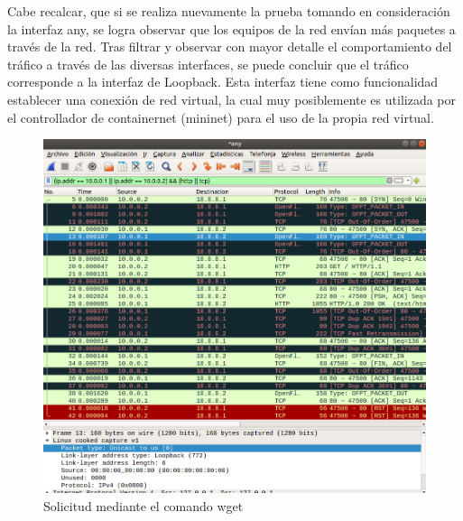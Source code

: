\documentclass[10pt]{article}
\begin{document}
\noindent
Cabe recalcar, que si se realiza nuevamente la prueba tomando en consideración la interfaz any, se logra observar que los equipos de la red envían más paquetes a través de la red. Tras filtrar y observar con mayor detalle el comportamiento del tráfico a través de las diversas interfaces, se puede concluir que el tráfico corresponde a la interfaz de Loopback. Esta interfaz tiene como funcionalidad establecer una conexión de red virtual, la cual muy posiblemente es utilizada por el controllador de containernet (mininet) para el uso de la propia red virtual.
\newline



\begin{multicols}{2}

\begin{figure}[H]
    \centering
    \includegraphics[width=\linewidth]{Imagenes/item02_GET_interface_any.png}
    \caption{Solicitud mediante el comando wget}
    \label{fig:item02_any}
\end{figure}

\columnbreak


\end{multicols}
\end{document}
